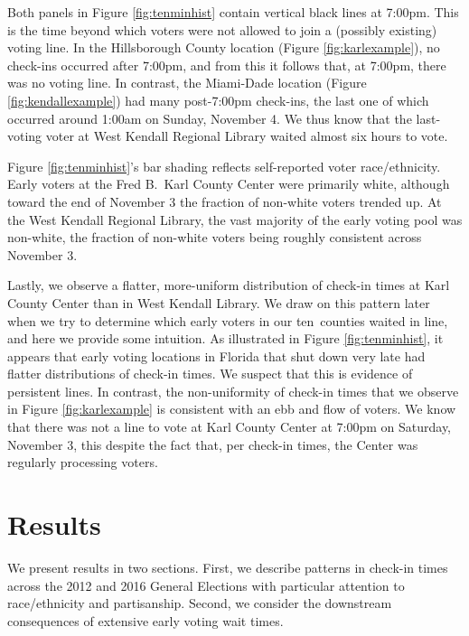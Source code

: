 \documentclass[12pt,titlepage]{article}
\newcommand{\numcounties}{ten}
\begin{document}
Both panels in Figure \ref{fig:tenminhist} contain vertical black
lines at 7:00pm. This is the time beyond which voters were not allowed
to join a (possibly existing) voting line. In the Hillsborough County
location (Figure \ref{fig:karlexample}), no check-ins occurred after
7:00pm, and from this it follows that, at 7:00pm, there was no voting
line. In contrast, the Miami-Dade location (Figure
\ref{fig:kendallexample}) had many post-7:00pm check-ins, the last one
of which occurred around 1:00am on Sunday, November 4. We thus know
that the last-voting voter at West Kendall Regional Library waited
almost six hours to vote.

Figure \ref{fig:tenminhist}'s bar shading reflects self-reported voter
race/ethnicity. Early voters at the Fred B.\ Karl County Center were
primarily white, although toward the end of November 3 the fraction of
non-white voters trended up. At the West Kendall Regional Library, the
vast majority of the early voting pool was non-white, the fraction of
non-white voters being roughly consistent across November 3.

Lastly, we observe a flatter, more-uniform distribution of check-in
times at Karl County Center than in West Kendall Library. We draw on
this pattern later when we try to determine which early voters in our
\numcounties\ counties waited in line, and here we provide some
intuition. As illustrated in Figure \ref{fig:tenminhist}, it appears
that early voting locations in Florida that shut down very late had
flatter distributions of check-in times. We suspect that this is
evidence of persistent lines. In contrast, the non-uniformity of
check-in times that we observe in Figure \ref{fig:karlexample} is
consistent with an ebb and flow of voters. We know that there was not
a line to vote at Karl County Center at 7:00pm on Saturday, November
3, this despite the fact that, per check-in times, the Center was
regularly processing voters.


\section*{Results}

We present results in two sections.  First, we describe patterns in
check-in times across the 2012 and 2016 General Elections with
particular attention to race/ethnicity and partisanship.  Second, we
consider the downstream consequences of extensive early voting wait
times.
\end{document}

